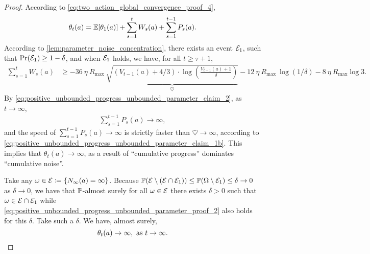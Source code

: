 \begin{proof}
According to \cref{eq:two_action_global_convergence_proof_4}, 
\begin{align}
\label{eq:positive_unbounded_progress_unbounded_parameter_proof_1}
    \theta_t(a) = \mathbb{E}[\theta_1(a)] + \sum_{s=1}^{t}{W_s(a)} + \sum_{s=1}^{t-1}{P_s(a)}.
\end{align}
According to 
\cref{lem:parameter_noise_concentration}, there exists an event ${\mathcal{E}}_1 $, such that $\operatorname*{Pr}({\mathcal{E}}_1 ) \ge 1- \delta$, and when ${\mathcal{E}}_1 $ holds, we have, for all $t \ge \tau+1$,
\begin{align}
\label{eq:positive_unbounded_progress_unbounded_parameter_proof_2}
    \sum_{s=1}^{t}{W_s(a)} &\ge - 36 \ \eta \ R_{\max} \ \underbrace{\sqrt{  (V_{t-1}(a)+4/3) \cdot \log \left( \frac{  V_{t-1}(a)+1  }{ \delta } \right) }}_{\heartsuit
    } - 12 \ \eta \ R_{\max} \ \log(1/\delta) -  8 \ \eta \ R_{\max}\log 3.
\end{align}
By \cref{eq:positive_unbounded_progress_unbounded_parameter_claim_2}, as $t \to \infty$,
\begin{align}
\label{eq:positive_unbounded_progress_unbounded_parameter_proof_3}
    \sum_{s=1}^{t-1}{P_s(a)} \to \infty,
\end{align}
and the speed of $\sum_{s=1}^{t-1}{P_s(a)} \to \infty$ is strictly faster than $\heartsuit \to \infty$, according to \cref{eq:positive_unbounded_progress_unbounded_parameter_claim_1b}. This implies that $\theta_t(a) \to \infty$, as a result of ``cumulative progress'' dominates ``cumulative noise''.

Take any $\omega \in {\mathcal{E}} \coloneqq \{ N_\infty(a) = \infty \}$. Because ${\mathbb{P}}{\left( {\mathcal{E}}  \setminus \left( {\mathcal{E}}  \cap {\mathcal{E}}_1  \right) \right)} \le {\mathbb{P}}{\left( \Omega \setminus {\mathcal{E}}_1  \right)} \le \delta \to 0$  as $\delta\to 0$, we have that ${\mathbb{P}}$-almost surely for all $\omega \in {\mathcal{E}} $
there exists $\delta > 0$ such that $\omega \in {\mathcal{E}} \cap {\mathcal{E}}_1 $
while
\cref{eq:positive_unbounded_progress_unbounded_parameter_proof_2} also holds for this $\delta$.
Take such a $\delta$. We have, almost surely,
\begin{equation*}
    \theta_t(a) \to \infty, \text{ as } t \to \infty. \qedhere
\end{equation*}
\end{proof}

